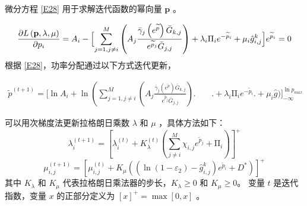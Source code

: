 微分方程 \eqref{E28} 用于求解迭代函数的幂向量 $\mathbf{p}$ 。

\begin{align}\label{E28}
\frac{\partial L\left(\mathbf{p},\lambda,\mu\right)}{\partial p_i}=A_i-\Bigl[\sum_{j=1,j\neq i}^{M}\left(A_j\frac{{\bar{\gamma}}_j\left(e^{\widetilde{p}}\right){\bar{G}}_{k,j}}{e^{{\widetilde{p}}_j}{\bar{G}}_{j,j}}\right)
+\lambda_i\mathrm{\Pi}_ie^{-{\widetilde{p}}_i}+\mu_i{\hat{g}}_{i,j}^k\Bigl]e^{{\widetilde{p}}_i}=0
\end{align}
根据 \eqref{E28}，功率分配通过以下方式迭代更新，

\begin{align}\label{E29}
{\widetilde{p}}^{\left(t+1\right)}=\Big[\ln{A_i}+\ln\left(\sum_{j=1,j\neq i}^{M}\left(A_j\frac{{\bar{\gamma}}_j\left(e^{\widetilde{p}}\right){\bar{G}}_{k,j}}{e^{{\widetilde{p}}_j}{\bar{G}}_{j,j}}\right)\Big.\right.\phantom{=\;\;}\Big.\!\!\!\!\!\!\!\!\!\!\!+\lambda_i\mathrm{\Pi}_ie^{-{\widetilde{p}}_i}\Big.+\mu_i\hat{g}\Big)
\Big]_{-\infty}^{\ln{p_{max}}}
\end{align}

可以用次梯度法更新拉格朗日乘数 $\lambda$ 和 $\mu$ ，具体方法如下：
\begin{equation}\label{E30}
\lambda_i^{\left(t+1\right)}=\left[\lambda_i^{\left(t\right)}+K_\lambda^{\left(t\right)}\left(\sum_{j\neq i}^{M}{\chi_{i,j}e^{{\widetilde{p}}_j}}+\mathrm{\Pi}_i\right)\right]^+
\end{equation}
\begin{equation}\label{E31}
\mu_{i,j}^{\left(t+1\right)}=\!\left[\mu_{i,j}^{\left(t\right)}+\!K_\mu\!\left(\left(\ln\left(1-\varepsilon_2\right)-{\hat{g}}_{i,j}^k\right)e^{{\widetilde{p}}_i}+D^\ast\right)\right]^+
\end{equation}
其中 $K_\lambda$ 和 $K_\mu$ 代表拉格朗日乘法器的步长，$K_\lambda\geq0$ 和 $K_\mu\geq0$。 变量 $t$ 是迭代指数，变量 $x$ 的正部分定义为 $\left[x\right]^+=\max{\left[0,x\right]} $ 。
